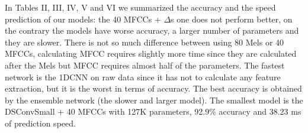 \documentclass[conference]{IEEEtran}
\begin{document}
In Tables II, III, IV, V and VI we summarized the accuracy and the speed prediction of our models: the 40 MFCCs + $\Delta$s one does not perform better, on the contrary the models have worse accuracy, a larger number of parameters and they are slower.
There is not so much difference between using 80 Mels or 40 MFCCs, calculating MFCC requires slightly more time since they are calculated after the Mels but MFCC requires almost half of the parameters.
The fastest network is the 1DCNN on raw data since it has not to calculate any feature extraction, but it is the worst in terms of accuracy.
The best accuracy is obtained by the ensemble network (the slower and larger model).
The smallest model is the DSConvSmall + 40 MFCCs with 127K parameters, 92.9\% accuracy and 38.23 ms of prediction speed.
\begin{center}
\begin{table}[]
\begin{center}
\caption{1DCNN performances on 10 and 21-commands datasets.}
\end{center}
\end{table}
\end{center}
\end{document}
